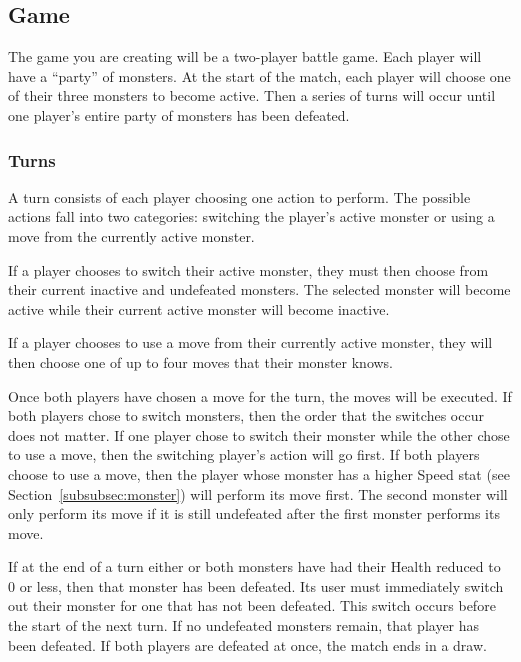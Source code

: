\documentclass[11pt]{cselabheader}
\begin{document}
\subsection{Game}
The game you are creating will be a two-player battle game. Each player will
have a ``party'' of monsters. At the start of the match, each player will choose
one of their three monsters to become active. Then a series of turns will occur
until one player's entire party of monsters has been defeated.

\subsubsection{Turns}
\label{subsubsec:turn}
A turn consists of each player choosing one action to perform. The possible
actions fall into two categories: switching the player's active monster or using
a move from the currently active monster.

If a player chooses to switch their active monster, they must then choose from
their current inactive and undefeated monsters. The selected monster will become
active while their current active monster will become inactive.

If a player chooses to use a move from their currently active monster, they will
then choose one of up to four moves that their monster knows.

Once both players have chosen a move for the turn, the moves will be executed.
If both players chose to switch monsters, then the order that the switches occur
does not matter. If one player chose to switch their monster while the other chose
to use a move, then the switching player's action will go first. If both players
choose to use a move, then the player whose monster has a higher Speed stat (see
Section~\ref{subsubsec:monster}) will perform its move first. The second monster
will only perform its move if it is still undefeated after the first monster
performs its move.

If at the end of a turn either or both monsters have had their Health reduced to 0
or less, then that monster has been defeated. Its user must immediately switch out
their monster for one that has not been defeated. This switch occurs before the start
of the next turn. If no undefeated monsters remain, that player has been defeated.
If both players are defeated at once, the match ends in a draw.
\end{document}
